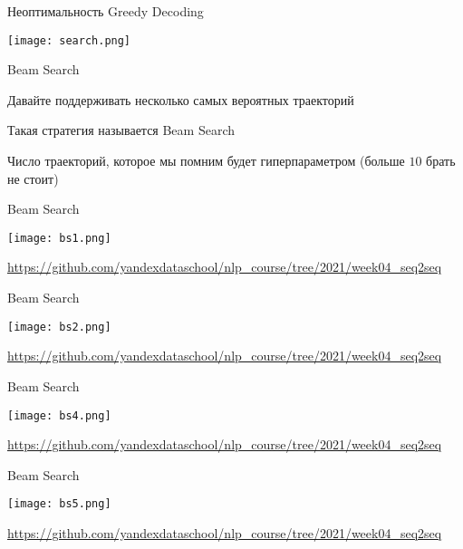 \documentclass[notes,12pt, aspectratio=169]{beamer}
\newenvironment{wideitemize}{\itemize\addtolength{\itemsep}{10pt}}{\enditemize}
\begin{document}
\begin{frame}{Неоптимальность Greedy Decoding}
	\begin{center}
			\texttt{[image: search.png]}
	\end{center}
\end{frame} 


\begin{frame}{Beam Search}
	\begin{wideitemize} 	
			\item  Давайте поддерживать несколько самых вероятных траекторий
			\item  Такая стратегия называется \alert{Beam Search}
			\item  Число траекторий, которое мы помним будет гиперпараметром (больше $10$ брать не стоит)
	\end{wideitemize} 
\end{frame} 



\begin{frame}{Beam Search}
	\begin{center}
		\texttt{[image: bs1.png]}
	\end{center}
	\vfill
	\footnotesize  {\color{blue} \url{https://github.com/yandexdataschool/nlp_course/tree/2021/week04_seq2seq}} 
\end{frame} 

\begin{frame}{Beam Search}
	\begin{center}
		\texttt{[image: bs2.png]}
	\end{center}
	\vfill
	\footnotesize  {\color{blue} \url{https://github.com/yandexdataschool/nlp_course/tree/2021/week04_seq2seq}} 
\end{frame} 

\begin{frame}{Beam Search}
	\begin{center}
		\texttt{[image: bs4.png]}
	\end{center}
	\vfill
	\footnotesize  {\color{blue} \url{https://github.com/yandexdataschool/nlp_course/tree/2021/week04_seq2seq}} 
\end{frame} 

\begin{frame}{Beam Search}
	\begin{center}
		\texttt{[image: bs5.png]}
	\end{center}
	\vfill
	\footnotesize  {\color{blue} \url{https://github.com/yandexdataschool/nlp_course/tree/2021/week04_seq2seq}} 
\end{frame} 
\end{document}
